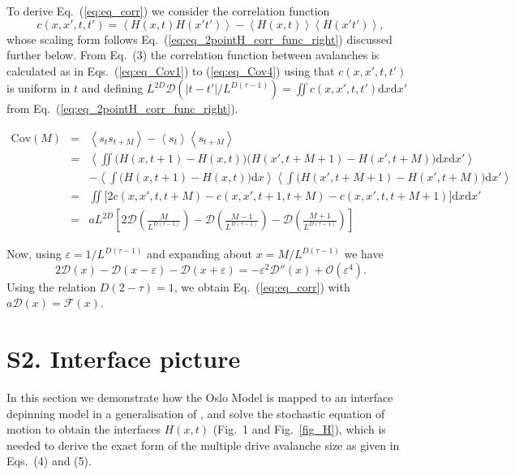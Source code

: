 \documentclass[doublecol]{epl2}
\newcommand{\ave}[1]{\left\langle{#1}\right\rangle}
\newcommand{\plaind}{\text{d}}
\newcommand{\elabel}[1]{\label{eq:#1}}
\newcommand{\eref}[1]{(\ref{eq:#1})}
\newcommand{\Eref}[1]{Eq.~(\ref{eq:#1})}
\newcommand{\Esref}[1]{Eqs.~(\ref{eq:#1})}
\newcommand{\Figref}[1]{Fig.~\ref{fig_#1}}
\newcommand{\bungledXR}[2]{#2}
\begin{document}
To derive \Eref{eq_corr} we consider the correlation function
\begin{equation}
c(x,x',t,t') = \ave{H(x,t)H(x't')} - \ave{H(x,t)}\ave{H(x't')},
\end{equation}
whose scaling form follows \Eref{eq_2pointH_corr_func_right} discussed further below. From \bungledXR{}{Eq.~(3)} the correlation function between avalanches is calculated as in \Esref{eq_Cov1} to \eref{eq_Cov4} using that $c(x,x',t,t')$ is uniform in $t$ and defining $L^{2D}\mathcal{D} \left(|t-t'|/L^{D(\tau-1)}\right) = \iint c(x,x',t,t')\plaind x\plaind x'$ from \Eref{eq_2pointH_corr_func_right}.
\begin{widetext}
\begin{eqnarray}
\text{Cov}(M)&=&\ave{s_ts_{t+M}}-\ave{s_t}\ave{s_{t+M}} \elabel{eq_Cov1}\\
&=&\ave{\iint\big(H(x,t+1)-H(x,t)\big)\big(H(x',t+M+1)-H(x',t+M)\big)\plaind x\plaind x'} \nonumber\\
&& - \ave{\int\big(H(x,t+1)-H(x,t)\big)\plaind x}\ave{\int\big(H(x',t+M+1)-H(x',t+M)\big)\plaind x'}\elabel{eq_Cov2}\\
&=& \iint \big[2c(x,x',t,t+M) -c(x,x',t+1,t+M) - c(x,x',t,t+M+1) \big]\plaind x\plaind x' \elabel{eq_Cov3}\\
&=& aL^{2D} \left[ 2\mathcal{D} \left(\frac{M}{L^{D(\tau-1)}}\right) -\mathcal{D} \left(\frac{M-1}{L^{D(\tau-1)}}\right) -\mathcal{D} \left(\frac{M+1}{L^{D(\tau-1)}}\right) \right] \elabel{eq_Cov4}
\end{eqnarray}
\end{widetext}
Now, using $\varepsilon = 1/ L^{D(\tau-1)}$ and expanding about $x=M/ L^{D(\tau-1)}$ we have
\begin{equation}
2\mathcal{D}(x)-\mathcal{D}(x-\varepsilon)-\mathcal{D}(x+\varepsilon)=-\varepsilon^2\mathcal{D}''(x) + \mathcal{O}(\varepsilon^4).
\end{equation}
Using the relation $D(2-\tau)=1$, we obtain \Eref{eq_corr} with $a\mathcal{D}(x)=\mathcal{F}(x)$.

\section{S2. Interface picture}
\label{sect_app_interface}

In this section we demonstrate how the Oslo Model is mapped to an interface depinning model in a generalisation of \cite{pruessner2003oslo,PhysRevLett.77.111}, and solve the stochastic equation of motion to obtain the interfaces $H(x,t)$ (\bungledXR{\Figref{s_sketch}}{Fig.~1} and \Figref{H}), which is needed to derive the exact form of the multiple drive avalanche size as given in \bungledXR{\Esref{eq_SM}}{Eqs.~(4)} and \bungledXR{\eref{eq_xi1}}{(5)}.
\end{document}
